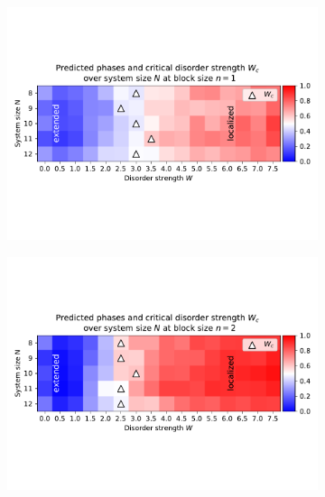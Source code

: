 \documentclass[reprint,amsmath,amssymb,aps,prb]{revtex4-2}
\begin{document}
\begin{center}
	\begin{figure}[h]
		\centering	
		\begin{subfigure}[c]{0.4\textwidth}
			\includegraphics[width=\textwidth, trim={0 3cm 0 3cm},clip]{../results/Wc/n1_Wc_N_dependency.pdf}
		\end{subfigure}
		\begin{subfigure}[c]{0.4\textwidth}
			\includegraphics[width=\textwidth, trim={0 3cm 0 3cm},clip]{../results/Wc/n2_Wc_N_dependency.pdf}
		\end{subfigure}
		\begin{subfigure}[c]{0.4\textwidth}

\end{subfigure}
\end{figure}
\end{center}
\end{document}
